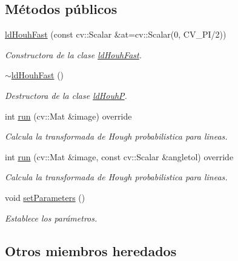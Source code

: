 \subsection*{Métodos públicos}
\begin{DoxyCompactItemize}
\item 
\hyperlink{class_i3_d_1_1ld_houh_fast_a750f01c43402983b0839ba47271a2dad}{ld\+Houh\+Fast} (const cv\+::\+Scalar \&at=cv\+::\+Scalar(0, C\+V\+\_\+\+PI/2))
\begin{DoxyCompactList}\small\item\em Constructora de la clase \hyperlink{class_i3_d_1_1ld_houh_fast}{ld\+Houh\+Fast}. \end{DoxyCompactList}\item 
\hyperlink{class_i3_d_1_1ld_houh_fast_abe17675e0e7f4aec0c9400f39a8e6963}{$\sim$ld\+Houh\+Fast} ()
\begin{DoxyCompactList}\small\item\em Destructora de la clase \hyperlink{class_i3_d_1_1ld_houh_p}{ld\+HouhP}. \end{DoxyCompactList}\item 
int \hyperlink{class_i3_d_1_1ld_houh_fast_a9cbcde2e4327ba3fd7c65d404bea5ee7}{run} (cv\+::\+Mat \&image) override
\begin{DoxyCompactList}\small\item\em Calcula la transformada de Hough probabilistica para lineas. \end{DoxyCompactList}\item 
int \hyperlink{class_i3_d_1_1ld_houh_fast_a41fd58bdeeb31893f4a98a90ce9ec516}{run} (cv\+::\+Mat \&image, const cv\+::\+Scalar \&angletol) override
\begin{DoxyCompactList}\small\item\em Calcula la transformada de Hough probabilistica para lineas. \end{DoxyCompactList}\item 
void \hyperlink{class_i3_d_1_1ld_houh_fast_a514054f1d58cff2d65f3b63f3dc67e32}{set\+Parameters} ()
\begin{DoxyCompactList}\small\item\em Establece los parámetros. \end{DoxyCompactList}\end{DoxyCompactItemize}
\subsection*{Otros miembros heredados}


